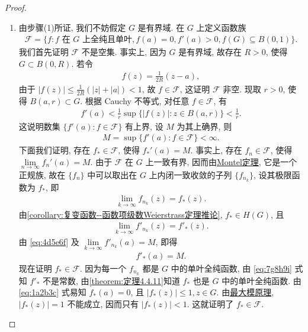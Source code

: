 \documentclass[../../main.tex]{subfiles}%
\begin{document}
\begin{proof}
\begin{enumerate}[(1)]
\item 由步骤(1)所证, 我们不妨假定 \(G\) 是有界域. 在 \(G\) 上定义函数族
\begin{align*}
\mathscr{F} = \{ f : \text{\(f\) 在 \(G\) 上全纯且单叶}, f(a) = 0, f'(a) > 0, f(G) \subseteq B(0, 1) \}.
\end{align*}
我们首先证明 \(\mathscr{F}\) 不是空集. 事实上, 因为 \(G\) 是有界域, 故存在 \(R > 0\), 使得 \(G \subset B(0, R)\). 若令
\begin{align*}
f(z) = \frac{1}{2R} (z - a),
\end{align*}
由于 \(|f(z)| \leqslant \frac{1}{2R} (|z| + |a|) < 1\), 故 \(f \in \mathscr{F}\), 这证明 \(\mathscr{F}\) 非空.
现取 \(r > 0\), 使得 \(B(a, r) \subset G\). 根据 Cauchy 不等式, 对任意 \(f \in \mathscr{F}\), 有
\begin{align*}
f'(a) < \frac{1}{r} \sup\{ |f(z)| : z \in B(a, r) \} < \frac{1}{r}.
\end{align*}
这说明数集 \(\{ f'(a) : f \in \mathscr{F} \}\) 有上界, 设 \(M\) 为其上确界, 则
\begin{align*}
M = \sup\{ f'(a) : f \in \mathscr{F} \} < \infty.
\end{align*}
下面我们证明, 存在 \(f_* \in \mathscr{F}\), 使得 \(f_*'(a) = M\). 事实上, 存在 \(f_n \in \mathscr{F}\), 使得 \(\lim\limits_{n \to \infty} f_n'(a) = M\). 由于 \(\mathscr{F}\) 在 \(G\) 上一致有界, 因而由\hyperref[theorem:复变-----Montel定理]{Montel定理}, 它是一个正规族, 故在 \(\{ f_n \}\) 中可以取出在 \(G\) 上内闭一致收敛的子列 \(\{ f_{n_k} \}\), 设其极限函数为 \(f_*\), 即
\begin{align}
\lim\limits_{k \to \infty} f_{n_k}(z) = f_*(z). \label{eq:1a2b3c}
\end{align}
由\cref{corollary:复变函数--函数项级数Weierstrass定理推论}, \(f_* \in H(G)\), 且
\begin{align}
\lim\limits_{k \to \infty} f'_{n_k}(z) = f'_*(z). \label{eq:4d5e6f}
\end{align}
由 \eqref{eq:4d5e6f} 及 \(\lim\limits_{k \to \infty} f'_{n_k}(a) = M\), 即得
\begin{align}
f'_*(a) = M. \label{eq:7g8h9i}
\end{align}
现在证明 \(f_* \in \mathscr{F}\). 因为每一个 \(f_{n_k}\) 都是 \(G\) 中的单叶全纯函数, 由 \eqref{eq:7g8h9i} 式知 \(f'_*\) 不是常数, 由\cref{theorem:定理4.4.11}知道 \(f_*\) 也是 \(G\) 中的单叶全纯函数. 由 \eqref{eq:1a2b3c} 式易知 \(f_*(a) = 0\), 且 \(|f_*(z)| \leqslant 1, z \in G\). 由\hyperref[theorem:最大模原理-定理4.5.1]{最大模原理}, \(|f_*(z)| = 1\) 不能成立, 因而只有 \(|f_*(z)| < 1\). 这就证明了 \(f_* \in \mathscr{F}\).


\end{enumerate}
\end{proof}
\end{document}
